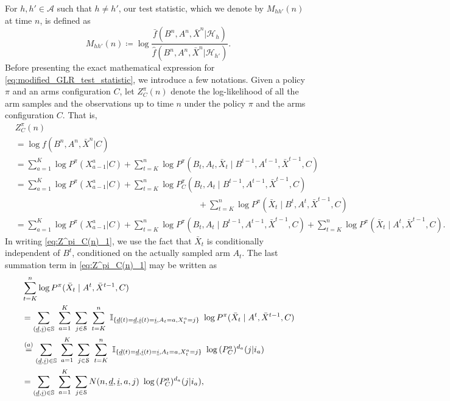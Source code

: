 For $h, h'\in \mathcal{A}$ such that $h\neq h'$, our test statistic, which we denote by $M_{hh'}(n)$ at time $n$, is defined as
\begin{equation}
	M_{hh'}(n)\coloneqq \log\frac{\bar{f}(B^n, A^n, \bar{X}^n|\mathcal{H}_h)}{\hat{f}(B^n, A^n, \bar{X}^n|\mathcal{H}_{h'})}.
	\label{eq:modified_GLR_test_statistic}
\end{equation}
Before presenting the exact mathematical expression for \eqref{eq:modified_GLR_test_statistic}, we introduce a few notations. Given a policy $\pi$ and an arms configuration $C$, let $Z_C^\pi(n)$ denote the log-likelihood of all the arm samples and the observations up to time $n$ under the policy $\pi$ and the arms configuration $C$. That is, 
\begingroup\allowdisplaybreaks\begin{align}
&Z^\pi_C(n) \nonumber\\
&=\log f(B^n, A^n, \bar{X}^n|C)\nonumber\\
&= \sum\limits_{a=1}^{K} \log P^\pi(X_{a-1}^a|C) + \sum\limits_{t=K}^{n} \log P^\pi(B_t, A_t, \bar{X}_t\mid B^{t-1}, A^{t-1}, \bar{X}^{t-1}, C) \nonumber\\
&=  \sum\limits_{a=1}^{K} \log P^\pi(X_{a-1}^a|C) + \sum\limits_{t=K}^{n} \log P^\pi_C(B_t, A_t\mid B^{t-1}, A^{t-1}, \bar{X}^{t-1}, C) \nonumber\\
&\hspace{9cm}+\sum\limits_{t=K}^{n} \log P^\pi(\bar{X}_t\mid B^t, A^t, \bar{X}^{t-1}, C)\nonumber\\
&= \sum\limits_{a=1}^{K} \log P^\pi(X_{a-1}^a|C) + \sum\limits_{t=K}^{n} \log P^\pi(B_t, A_t\mid B^{t-1}, A^{t-1}, \bar{X}^{t-1}, C) + \sum\limits_{t=K}^{n} \log P^\pi(\bar{X}_t\mid A^t, \bar{X}^{t-1}, C).
\label{eq:Z^pi_C(n)_1}
\end{align}\endgroup
In writing \eqref{eq:Z^pi_C(n)_1}, we use the fact that $\bar{X}_t$ is conditionally independent of $B^t$, conditioned on the actually sampled arm $A_t$. The last summation term in \eqref{eq:Z^pi_C(n)_1} may be written as
\begin{align}
&\sum\limits_{t=K}^{n} \log P^\pi(\bar{X}_t\mid A^t, \bar{X}^{t-1}, C) \nonumber\\
&= \sum\limits_{(\underline{d}, \underline{i}) \in \mathbb{S}} ~\sum\limits_{a=1}^{K}~\sum\limits_{j\in \mathcal{S}}~\sum\limits_{t=K}^{n}  ~\mathbb{I}_{\{\underline{d}(t)=\underline{d}, \underline{i}(t)=\underline{i}, A_t=a, {\color{black} {X}_t^a=j}\}} ~\log P^\pi(\bar{X}_t\mid A^t, \bar{X}^{t-1}, C) \nonumber\\
&\stackrel{(a)}{=} \sum\limits_{(\underline{d}, \underline{i}) \in \mathbb{S}} ~\sum\limits_{a=1}^{K}~\sum\limits_{j\in \mathcal{S}}~\sum\limits_{t=K}^{n} ~ \mathbb{I}_{\{\underline{d}(t)=\underline{d}, \underline{i}(t)=\underline{i}, A_t=a, {\color{black} {X}_t^a=j}\}} ~\log \, (P_C^a)^{d_a}(j|i_a) \nonumber\\
&=  \sum\limits_{(\underline{d}, \underline{i}) \in \mathbb{S}} ~\sum\limits_{a=1}^{K}~\sum\limits_{j\in \mathcal{S}} N(n, \underline{d}, \underline{i}, a, j)~\log \, (P_C^a)^{d_a}(j|i_a),
\label{eq:Z^pi_C(n)_2}
\end{align}
